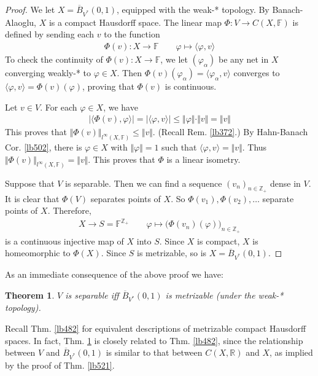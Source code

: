 \documentclass[12pt,b5paper,notitlepage]{article}
\theoremstyle{definition}
\theoremstyle{plain}
\newtheorem{thm}[df]{Theorem}
\newcommand{\ovl}{\overline}
\newcommand{\bk}[1]{\langle {#1}\rangle}
\newcommand{\Zbb}{\mathbb Z}
\newcommand{\Rbb}{\mathbb R}
\newcommand{\Fbb}{\mathbb F}
\numberwithin{equation}{section}
\begin{document}
\begin{proof}
We let $X=\ovl B_{V^*}(0,1)$, equipped with the weak-* topology. By Banach-Alaoglu, $X$ is a compact Hausdorff space. The linear map $\Phi:V\rightarrow C(X,\Fbb)$ is defined by sending each $v$ to the function
\begin{align*}
\Phi(v):X\rightarrow \Fbb\qquad\varphi\mapsto \bk{\varphi,v}
\end{align*}
To check the continuity of $\Phi(v):X\rightarrow\Fbb$, we let $(\varphi_\alpha)$ be any net in $X$ converging weakly-* to $\varphi\in X$. Then $\Phi(v)(\varphi_\alpha)=\bk{\varphi_\alpha,v}$ converges to $\bk{\varphi,v}=\Phi(v)(\varphi)$, proving that $\Phi(v)$ is continuous.

Let $v\in V$. For each $\varphi\in X$, we have
\begin{align*}
|\bk{\Phi(v),\varphi}|=|\bk{\varphi,v}|\leq\Vert\varphi\Vert\cdot\Vert v\Vert=\Vert v\Vert
\end{align*}
This proves that $\Vert \Phi(v)\Vert_{l^\infty(X,\Fbb)}\leq \Vert v\Vert$. (Recall Rem. \ref{lb372}.) By Hahn-Banach Cor. \ref{lb502}, there is $\varphi\in X$ with $\Vert\varphi\Vert=1$ such that $\bk{\varphi,v}=\Vert v\Vert$. Thus $\Vert \Phi(v)\Vert_{l^\infty(X,\Fbb)}=\Vert v\Vert$. This proves that $\Phi$ is a linear isometry.

Suppose that $V$ is separable. Then we can find a sequence $(v_n)_{n\in\Zbb_+}$ dense in $V$.  It is clear that $\Phi(V)$ separates points of $X$. So $\Phi(v_1),\Phi(v_2),\dots$ separate points of $X$.
Therefore,
\begin{align}
X\rightarrow S=\Fbb^{\Zbb_+}\qquad \varphi\mapsto \big(\Phi(v_n)(\varphi)\big)_{n\in\Zbb_+}
\end{align} 
is a continuous injective map of $X$ into $S$. Since $X$ is compact, $X$ is homeomorphic to $\Phi(X)$. Since $S$ is metrizable, so is $X=\ovl B_{V^*}(0,1)$.
\end{proof}


As an immediate consequence of the above proof we have:

\begin{thm}\label{lb523}
$V$ is separable iff $\ovl B_{V^*}(0,1)$ is metrizable (under the weak-* topology).
\end{thm}

Recall Thm. \ref{lb482} for equivalent descriptions of metrizable compact Hausdorff spaces. In fact, Thm. \ref{lb523} is closely related to Thm. \ref{lb482}, since the relationship between $V$ and $\ovl B_{V^*}(0,1)$ is similar to that between $C(X,\Rbb)$ and $X$, as implied by the proof of Thm. \ref{lb521}. 
\end{document}
